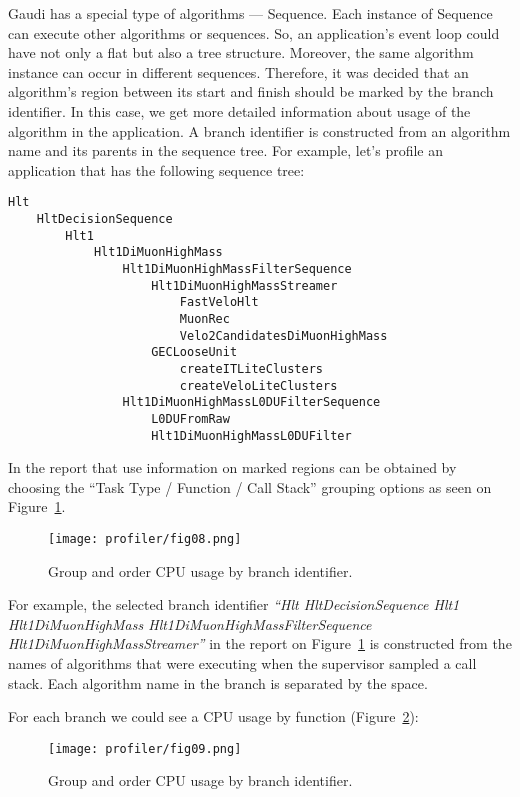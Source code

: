 Gaudi has a special type of algorithms --- Sequence. Each instance of Sequence
can execute other algorithms or sequences. So, an application's event loop
could have not only a flat but also a tree structure. Moreover, the same
algorithm instance can occur in different sequences. Therefore, it was decided
that an algorithm's region between its start and finish should be marked by the
branch identifier. In this case, we get more detailed information about usage
of the algorithm in the application. A branch identifier is constructed from an
algorithm name and its parents in the sequence tree. For example, let's profile
an application that has the following sequence tree:
\begin{verbatim}
Hlt 
    HltDecisionSequence 
        Hlt1 
            Hlt1DiMuonHighMass
                Hlt1DiMuonHighMassFilterSequence
                    Hlt1DiMuonHighMassStreamer
                        FastVeloHlt
                        MuonRec
                        Velo2CandidatesDiMuonHighMass
                    GECLooseUnit
                        createITLiteClusters
                        createVeloLiteClusters
                Hlt1DiMuonHighMassL0DUFilterSequence
                    L0DUFromRaw
                    Hlt1DiMuonHighMassL0DUFilter
\end{verbatim}

In \amp the report that use information on marked regions can be obtained by
choosing the ``Task Type / Function / Call Stack'' grouping options as seen on
Figure~\ref{fig08}.

\begin{figure}[H]
\texttt{[image: profiler/fig08.png]}
\caption{Group and order CPU usage by branch identifier.}
\label{fig08}
\end{figure}

For example, the selected branch identifier {\it ``Hlt HltDecisionSequence Hlt1 Hlt1DiMuonHighMass Hlt1DiMuonHighMassFilterSequence Hlt1DiMuonHighMassStreamer''} in the report on Figure~\ref{fig08} is constructed from the names of algorithms that were executing 
when the \amp supervisor sampled a call stack. Each algorithm name in the branch is separated by the space. 

For each branch we could see a CPU usage by function (Figure~\ref{fig09}):

\begin{figure}[H]
\texttt{[image: profiler/fig09.png]}
\caption{Group and order CPU usage by branch identifier.}
\label{fig09}
\end{figure}

